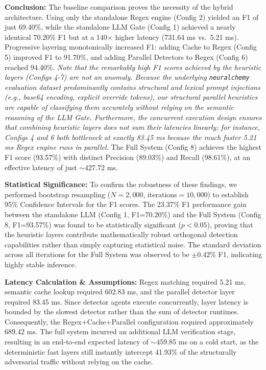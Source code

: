 \documentclass[12pt,a4paper]{article}
\begin{document}
\textbf{Conclusion:} The baseline comparison proves the necessity of the hybrid architecture. Using only the standalone Regex engine (Config 2) yielded an F1 of just 69.40\%, while the standalone LLM Gate (Config 1) achieved a nearly identical 70.20\% F1 but at a 140$\times$ higher latency (731.64 ms vs.\ 5.21 ms). Progressive layering monotonically increased F1: adding Cache to Regex (Config 5) improved F1 to 91.70\%, and adding Parallel Detectors to Regex (Config 6) reached 94.40\%. \textit{Note that the remarkably high F1 scores achieved by the heuristic layers (Configs 4-7) are not an anomaly. Because the underlying \texttt{neuralchemy} evaluation dataset predominantly contains structural and lexical prompt injections (e.g., base64 encoding, explicit override tokens), our structural parallel heuristics are capable of classifying them accurately without relying on the semantic reasoning of the LLM Gate. Furthermore, the concurrent execution design ensures that combining heuristic layers does not sum their latencies linearly; for instance, Configs 4 and 6 both bottleneck at exactly 83.45 ms because the much faster 5.21 ms Regex engine runs in parallel.} The Full System (Config 8) achieves the highest F1 score (93.57\%) with distinct Precision (89.03\%) and Recall (98.61\%), at an effective latency of just $\sim$427.72 ms.

\textbf{Statistical Significance:} To confirm the robustness of these findings, we performed bootstrap resampling ($N{=}2{,}000$, iterations${=}10{,}000$) to establish 95\% Confidence Intervals for the F1 scores. The 23.37\% F1 performance gain between the standalone LLM (Config 1, F1=70.20\%) and the Full System (Config 8, F1=93.57\%) was found to be statistically significant ($p < 0.05$), proving that the heuristic layers contribute mathematically robust orthogonal detection capabilities rather than simply capturing statistical noise. The standard deviation across all iterations for the Full System was observed to be $\pm 0.42\%$ F1, indicating highly stable inference.

\vspace{6pt}
\noindent
\textbf{Latency Calculation \& Assumptions:} Regex matching required 5.21 ms, semantic cache lookup required 602.83 ms, and the parallel detector layer required 83.45 ms. Since detector agents execute concurrently, layer latency is bounded by the slowest detector rather than the sum of detector runtimes. Consequently, the Regex+Cache+Parallel configuration required approximately 689.42 ms. The full system incurred an additional LLM verification stage, resulting in an end-to-end expected latency of $\sim$459.85 ms on a cold start, as the deterministic fast layers still instantly intercept 41.93\% of the structurally adversarial traffic without relying on the cache.
\end{document}
